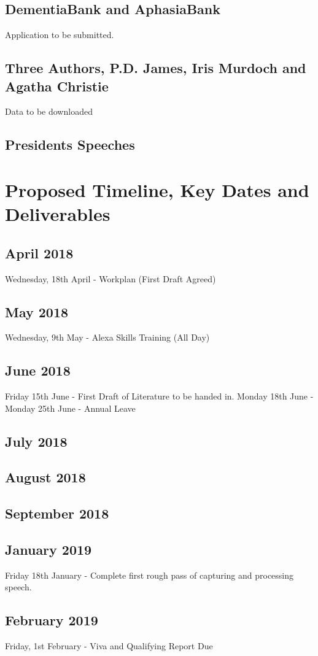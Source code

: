 \documentclass{article}
\begin{document}
	\subsection{DementiaBank and AphasiaBank}
	Application to be submitted.
	
	\subsection {Three Authors, P.D. James, Iris Murdoch and Agatha Christie}	
	Data to be downloaded
	
	\subsection{Presidents Speeches}
	
	
	\section{Proposed Timeline, Key Dates and Deliverables}
	\subsection{April 2018}
	Wednesday, 18th April - Workplan (First Draft Agreed)
	\subsection{May 2018}
	Wednesday, 9th May - Alexa Skills Training (All Day)
	\subsection{June 2018}
	Friday 15th June - First Draft of Literature to be handed in.
	Monday 18th June - Monday 25th June - Annual Leave
	\subsection{July 2018}
	
	\subsection{August 2018}
	
	\subsection{September 2018}
	
	
	\subsection{January 2019}
	Friday 18th January - Complete first rough pass of capturing and processing speech.
	
	\subsection{February 2019}
	Friday, 1st February - Viva and Qualifying Report Due
\end{document}
